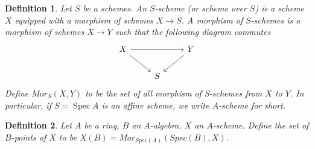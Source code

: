 \documentclass{ctexart}
\newtheorem{definition}{Definition}[section]
\newcommand{\spec}{\operatorname{Spec}}
\begin{document}
\begin{definition}
    Let $S$ be a schemes.
    An $S$-scheme (or scheme over $S$) is a scheme $X$ equipped with a morphism of schemes $X \longrightarrow S$.
    A morphism of $S$-schemes is a morphism of schemes $X \longrightarrow Y$ such that the following diagram commutes
    \begin{equation*}
        \begin{tikzcd}
            X \arrow[rr] \arrow[dr] &&
            Y \arrow[dl] \\
            & S &
        \end{tikzcd}
    \end{equation*}
    Define $Mor_{S}(X, Y)$ to be the set of all morphism of S-schemes from $X$ to $Y$.
    In particular, if $S = \spec A$ is an affine scheme, we write $A$-scheme for short.
\end{definition}
\begin{definition}
    Let $A$ be a ring, $B$ an $A$-algebra, $X$ an $A$-scheme.
    Define the set of $B$-points of $X$ to be $X(B) = Mor_{Spec(A)}(Spec(B), X)$. 
\end{definition}
\end{document}

